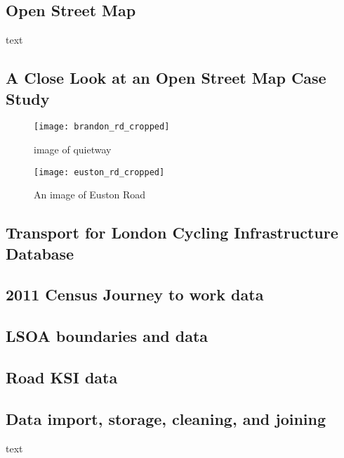 \subsection{Open Street Map}

text

\subsection{A Close Look at an Open Street Map Case Study}

\begin{figure}
\centering
\texttt{[image: brandon\_rd\_cropped]}
\caption{image of quietway}
\end{figure}

\begin{figure}
\centering
\texttt{[image: euston\_rd\_cropped]}
\caption{An image of Euston Road}
\label{fig:euston}
\end{figure}

\subsection{Transport for London Cycling Infrastructure Database}

\subsection{2011 Census Journey to work data}

\subsection{LSOA boundaries and data}
	
\subsection{Road KSI data}
	
\subsection{Data import, storage, cleaning, and joining}

text